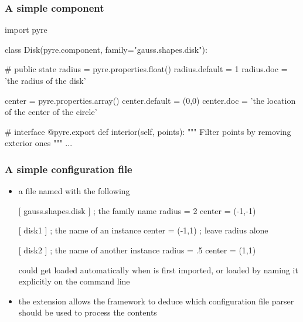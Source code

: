 \begin{frame}[fragile]
%
  \frametitle{A simple component}
%
  \begin{ipython}{}
import pyre

class Disk(pyre.component, family="gauss.shapes.disk"):

    # public state
    radius = pyre.properties.float()
    radius.default = 1
    radius.doc = 'the radius of the disk'

    center = pyre.properties.array()
    center.default = (0,0)
    center.doc = 'the location of the center of the circle'

    # interface
    @pyre.export
    def interior(self, points):
        """
        Filter {points} by removing exterior ones
        """
        ...
  \end{ipython}
%
\end{frame}

\begin{frame}[fragile]
%
  \frametitle{A simple configuration file}
%
  \begin{itemize}
%
  \item a file named  with the following
%
  \begin{icfg}{}
 [ gauss.shapes.disk ] ; the family name
 radius = 2
 center = (-1,-1)

 [ disk1 ] ; the name of an instance
 center = (-1,1)   ; leave {radius} alone

 [ disk2 ] ; the name of another instance
 radius = .5
 center = (1,1)
  \end{icfg}
%
  could get loaded automatically when  is first imported, or loaded by naming it
  explicitly on the command line
%
  \item the  extension allows the framework to deduce which configuration file
    parser should be used to process the contents
%
  \end{itemize}
%
\end{frame}

%
%

